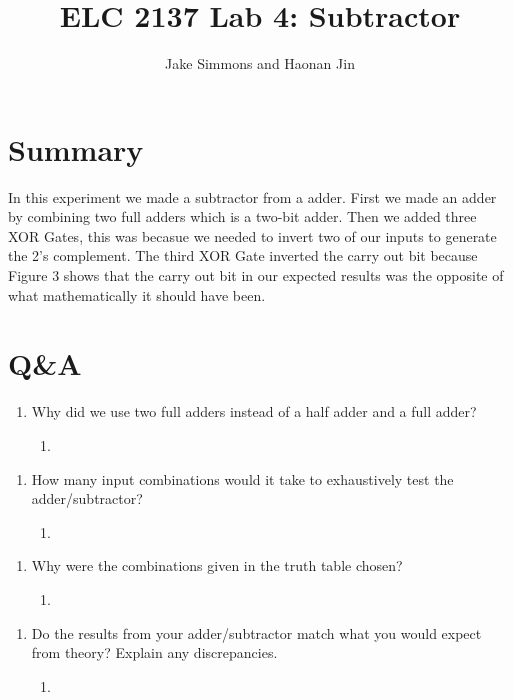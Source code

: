 \documentclass[11pt]{article}
\begin{document}
\title{ELC 2137 Lab 4: Subtractor}
\author{Jake Simmons and Haonan Jin }

\maketitle


\section*{Summary}

In this experiment we made a subtractor from a adder. First we made an adder by combining two full adders which is a two-bit adder. Then we added three XOR Gates, this was becasue we needed to invert two of our inputs to generate the 2's complement. The third XOR Gate inverted the carry out bit because Figure 3 shows that the carry out bit in our expected results was the opposite of what mathematically it should have been.


\section*{Q\&A}

\begin{enumerate}
	\item Why did we use two full adders instead of a half adder and a full adder?
		\begin{enumerate}
			\item 
		\end{enumerate}
\end{enumerate}

\begin{enumerate}
	\item How many input combinations would it take to exhaustively test the adder/subtractor?
	\begin{enumerate}
		\item 
	\end{enumerate}
\end{enumerate}

\begin{enumerate}
	\item Why were the combinations given in the truth table chosen?
	\begin{enumerate}
		\item 
	\end{enumerate}
\end{enumerate}

\begin{enumerate}
	\item Do the results from your adder/subtractor match what you would expect from theory? Explain any discrepancies.
	\begin{enumerate}
		\item 
	\end{enumerate}
\end{enumerate}
\end{document}
